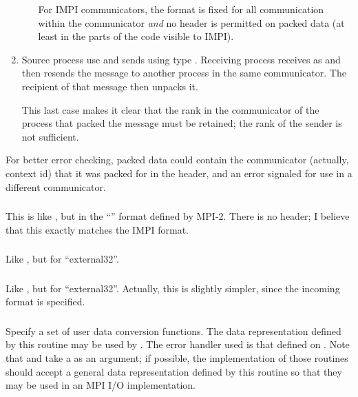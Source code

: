\documentclass{article}
\begin{document}
\begin{enumerate}
\begin{enumerate}
    For IMPI communicators, the format is fixed for all communication within
    the communicator \emph{and} no header is permitted on packed data (at
    least in the parts of the code visible to IMPI).
  \end{enumerate}
\item Source process use  and sends using type
  .  Receiving process receives as 
  and then resends the message to another process in the same communicator.
  The recipient of that message then unpacks it.

  This last case makes it clear that the rank in the communicator of the
  process that packed the message must be retained; the rank of the sender is
  not sufficient.
\end{enumerate}

For better error checking, packed data could contain the communicator
(actually, context id) that it was packed for in the header, and an
error signaled for use in a different communicator.

\subsubsection{}
This is like , but in the ``'' format
defined by MPI-2.  There is no header; I believe that this exactly matches the
IMPI format.

\subsubsection{}
Like , but for ``external32''.

\subsubsection{}
Like , but for ``external32''.  Actually, this is
slightly simpler, since the incoming format is specified.

\subsubsection{}
Specify a set of user data conversion functions.  The data representation
defined by this routine may be used by .  The error
handler used is that defined on .  Note that
 and  take a
 as an argument; if possible, the implementation of those
routines should accept a general data representation defined by this routine
so that they may be used in an MPI I/O implementation.
\end{document}
